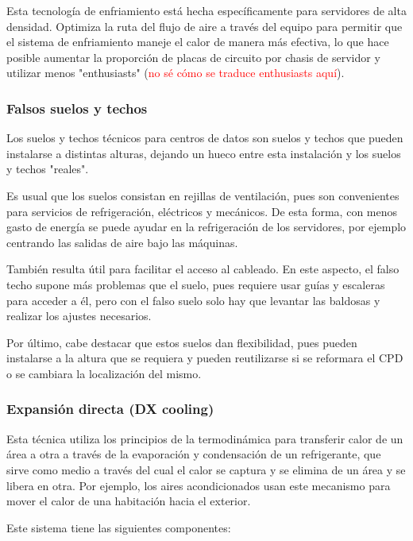Esta tecnología de enfriamiento está hecha específicamente para servidores de alta densidad. Optimiza la ruta del flujo de aire a través del equipo para permitir que el sistema de enfriamiento maneje el calor de manera más efectiva, lo que hace posible aumentar la proporción de placas de circuito por chasis de servidor y utilizar menos "enthusiasts" (\textcolor{red}{no sé cómo se traduce enthusiasts aquí}).

\subsubsection{Falsos suelos y techos}

Los suelos y techos técnicos para centros de datos son suelos y techos que pueden instalarse a distintas alturas, dejando un hueco entre esta instalación y los suelos y techos "reales".

Es usual que los suelos consistan en rejillas de ventilación, pues son convenientes para servicios de refrigeración, eléctricos y mecánicos. De esta forma, con menos gasto de energía se puede ayudar en la refrigeración de los servidores, por ejemplo centrando las salidas de aire bajo las máquinas.

También resulta útil para facilitar el acceso al cableado. En este aspecto, el falso techo supone más problemas que el suelo, pues requiere usar guías y escaleras para acceder a él, pero con el falso suelo solo hay que levantar las baldosas y realizar los ajustes necesarios.

Por último, cabe destacar que estos suelos dan flexibilidad, pues pueden instalarse a la altura que se requiera y pueden reutilizarse si se reformara el CPD o se cambiara la localización del mismo.

\subsubsection{Expansión directa (DX cooling)}

Esta técnica utiliza los principios de la termodinámica para transferir calor de un área a otra a través de la evaporación y condensación de un refrigerante, que sirve como medio a través del cual el calor se captura y se elimina de un área y se libera en otra. Por ejemplo, los aires acondicionados usan este mecanismo para mover el calor de una habitación hacia el exterior.

Este sistema tiene las siguientes componentes:


